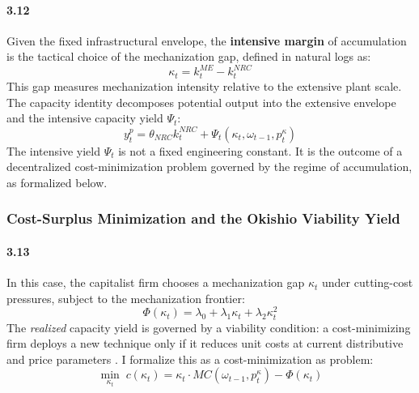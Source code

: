\paragraph{3.12}
Given the fixed infrastructural envelope, the
\textbf{intensive margin} of accumulation is the tactical
choice of the mechanization gap, defined in natural logs as:
\begin{equation}
	\kappa_t = k^{ME}_t - k^{NRC}_t
	\label{eq:32:kappa_def}
\end{equation}
This gap measures mechanization intensity relative to the
extensive plant scale. The capacity identity decomposes
potential output into the extensive envelope and the
intensive capacity yield $\Psi_t$:
\begin{equation}
	y^p_t = \theta_{NRC} k^{NRC}_t
	+ \Psi_t(\kappa_t, \omega_{t-1}, p^\kappa_t)
	\label{eq:32:capacity_decomp}
\end{equation}
The intensive yield $\Psi_t$ is not a fixed engineering
constant. It is the outcome of a decentralized
cost-minimization problem governed by the regime of
accumulation, as formalized below.

\subsubsection{Cost-Surplus Minimization and the Okishio
	Viability Yield}

\paragraph{3.13}
In this case, the capitalist firm chooses a mechanization gap $\kappa_t$ under cutting-cost pressures, subject to the
mechanization frontier:
\begin{equation}
	\Phi(\kappa_t) = \lambda_0 + \lambda_1 \kappa_t
	+ \lambda_2 \kappa_t^2
	\label{eq:32:frontier_kappa}
\end{equation}
The \textit{realized} capacity yield is governed by a viability condition: a
cost-minimizing firm deploys a new technique only if it
reduces unit costs at current distributive and price
parameters \citep{Okishio1961, Basu2022}. I formalize
this as a cost-minimization as problem:
\begin{equation}
	\min_{\kappa_t}\; c(\kappa_t)
	= \kappa_t \cdot MC(\omega_{t-1}, p^\kappa_t) -\Phi(\kappa_t)
	\label{eq:32:objective_kappa}
\end{equation}

